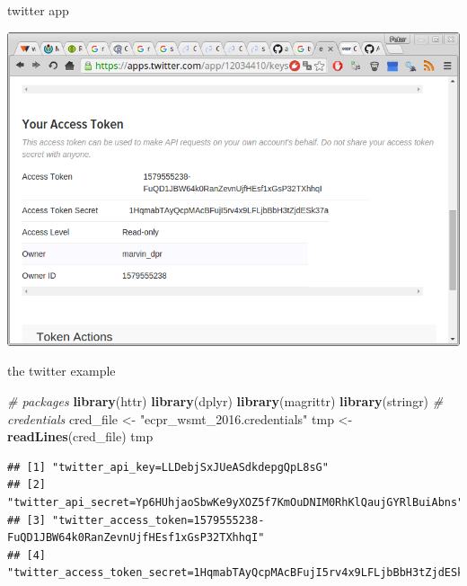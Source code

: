\documentclass[ignorenonframetext,]{beamer}
\newenvironment{Shaded}{\begin{snugshade}}{\end{snugshade}}
\newcommand{\KeywordTok}[1]{\textcolor[rgb]{0.13,0.29,0.53}{\textbf{{#1}}}}
\newcommand{\StringTok}[1]{\textcolor[rgb]{0.31,0.60,0.02}{{#1}}}
\newcommand{\CommentTok}[1]{\textcolor[rgb]{0.56,0.35,0.01}{\textit{{#1}}}}
\newcommand{\NormalTok}[1]{{#1}}
\begin{document}
\begin{frame}{twitter app}

\includegraphics{fig/twitterapp7.png}

\end{frame}

\begin{frame}[fragile]{the twitter example}

\begin{Shaded}
\begin{Highlighting}[]
\CommentTok{# packages}
\KeywordTok{library}\NormalTok{(httr)}
\KeywordTok{library}\NormalTok{(dplyr)}
\KeywordTok{library}\NormalTok{(magrittr)}
\KeywordTok{library}\NormalTok{(stringr)}
\CommentTok{# credentials}
\NormalTok{cred_file <-}\StringTok{ "ecpr_wsmt_2016.credentials"}
\NormalTok{tmp       <-}\StringTok{ }\KeywordTok{readLines}\NormalTok{(cred_file)}
\NormalTok{tmp}
\end{Highlighting}
\end{Shaded}

\begin{verbatim}
## [1] "twitter_api_key=LLDebjSxJUeASdkdepgQpL8sG"                                
## [2] "twitter_api_secret=Yp6HUhjaoSbwKe9yXOZ5f7KmOuDNIM0RhKlQaujGYRlBuiAbns"    
## [3] "twitter_access_token=1579555238-FuQD1JBW64k0RanZevnUjfHEsf1xGsP32TXhhqI"  
## [4] "twitter_access_token_secret=1HqmabTAyQcpMAcBFujI5rv4x9LFLjbBbH3tZjdESk37a"
\end{verbatim}

\end{frame}
\end{document}
